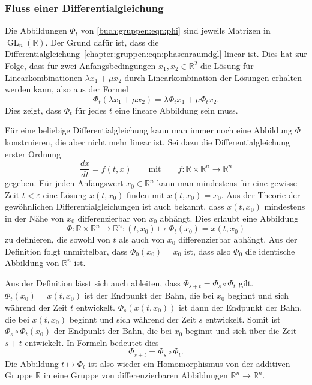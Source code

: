 \subsubsection{Fluss einer Differentialgleichung}
%
Die Abbildungen $\Phi_t$ von \eqref{buch:gruppen:eqn:phi} sind jeweils
Matrizen in $\operatorname{GL}_n(\mathbb{R})$.
Der Grund dafür ist, dass die
Differentialgleichung~\eqref{chapter:gruppen:eqn:phasenraumdgl}
linear ist.
Dies hat zur Folge, dass für zwei Anfangsbedingungen $x_1,x_2\in\mathbb{R}^2$
die Lösung für Linearkombinationen $\lambda x_1+\mu x_2$ durch
Linearkombination der Lösungen erhalten werden kann, also
aus der Formel
\[
\Phi_t (\lambda x_1 + \mu x_2) = \lambda \Phi_t x_1 + \mu \Phi_t x_2.
\]
Dies zeigt, dass $\Phi_t$ für jedes $t$ eine lineare Abbildung sein muss.

Für eine beliebige Differentialgleichung kann man immer noch eine Abbildung
$\Phi$ konstruieren, die aber nicht mehr linear ist.
Sei dazu die Differentialgleichung erster Ordnung
\begin{equation}
\frac{dx}{dt}
=
f(t,x)
\qquad\text{mit}\qquad
f\colon \mathbb{R}\times\mathbb{R}^n \to \mathbb{R}^n
\label{buch:gruppen:eqn:dgl}
\end{equation}
gegeben.
Für jeden Anfangswert $x_0\in\mathbb{R}^n$ kann man mindestens für eine
gewisse Zeit $t <\varepsilon$ eine Lösung $x(t,x_0)$ finden mit $x(t,x_0)=x_0$.
Aus der Theorie der gewöhnlichen Differentialgleichungen ist auch
bekannt, dass $x(t,x_0)$ mindestens in der Nähe von $x_0$ differenzierbar von
$x_0$ abhängt.
Dies erlaubt eine Abbildung
\[
\Phi\colon \mathbb{R}\times \mathbb{R}^n \to \mathbb{R}^n
:
(t,x_0) \mapsto \Phi_t(x_0) = x(t,x_0)
\]
zu definieren, die sowohl von $t$ als auch von $x_0$ differenzierbar
abhängt.
Aus der Definition folgt unmittelbar, dass $\Phi_0(x_0)=x_0$ ist, dass
also $\Phi_0$ die identische Abbildung von $\mathbb{R}^n$ ist.

Aus der Definition lässt sich auch ableiten, dass
$\Phi_{s+t}=\Phi_s\circ\Phi_t$ gilt.
$\Phi_t(x_0)=x(t,x_0)$ ist der Endpunkt der Bahn, die bei $x_0$ beginnt
und sich während der Zeit $t$ entwickelt.
$\Phi_s(x(t,x_0))$ ist dann der Endpunkt der Bahn, die bei $x(t,x_0)$ 
beginnt und sich während der Zeit $s$ entwickelt.
Somit ist $\Phi_s\circ \Phi_t(x_0)$ der Endpunkt der Bahn, die bei
$x_0$ beginnt und sich über die Zeit $s+t$ entwickelt.
In Formeln bedeutet dies
\[
\Phi_{s+t} = \Phi_s\circ \Phi_t.
\]
Die Abbildung $t\mapsto \Phi_t$ ist also wieder ein Homomorphismus
von der additiven Gruppe $\mathbb{R}$ in eine Gruppe von differenzierbaren
Abbildungen $\mathbb{R}^n\to\mathbb{R}^n$.

